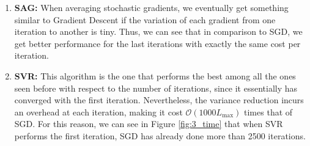 \documentclass[letterpaper]{article}
\providecommand{\1}{\mathbf{1}}
\providecommand{\0}{\mathbf{0}}
\begin{document}
\begin{enumerate}[label=(\alph*)]
    \item \textbf{SAG: }When averaging stochastic gradients, we eventually get something similar to Gradient Descent if the variation of each gradient from one iteration to another is tiny. Thus, we can see that in comparison to SGD, we get better performance for the last iterations with exactly the same cost per iteration.
    
    \item \textbf{SVR: }This algorithm is the one that performs the best among all the ones seen before with respect to the number of iterations, since it essentially has converged with the first iteration. Nevertheless, the variance reduction incurs an overhead at each iteration, making it cost $\mathcal{O}(1000L_{\max})$ times that of SGD. For this reason, we can see in Figure \ref{fig:3_time} that when SVR performs the first iteration, SGD has already done more than 2500 iterations.
    
\end{enumerate}
\end{document}
